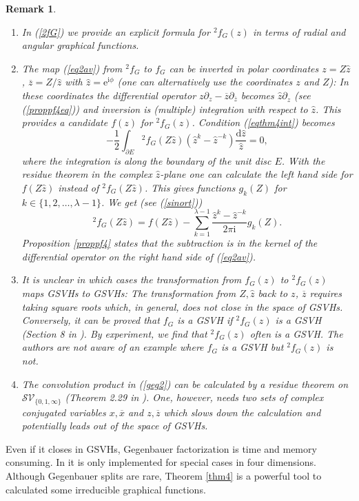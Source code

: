 \documentclass[oneside]{amsart}
\newcommand{\CC}{{\mathbb C}}
\newcommand{\ee}{\mathrm{e}}
\newcommand{\ii}{\mathrm{i}}
\newcommand{\dd}{\mathrm{d}}
\newcommand{\xx}{{\overline{x}}}
\newcommand{\zz}{{\overline{z}}}
\newcommand{\sS}{\mathcal{S}}
\newcommand{\sV}{\mathcal{V}}
\theoremstyle{plain}
\newtheorem{remark}[thm]{Remark}
\begin{document}
\begin{remark}
\begin{enumerate}
The parametric representation ensures that ${}^2\!f_G(z)/(z-\zz)$ is real-analytic on $\CC\backslash\{0,1\}$.
\item In (\ref{2fG}) we provide an explicit formula for ${}^2\!f_G(z)$ in terms of radial and angular graphical functions.
\item The map (\ref{eq2av}) from ${}^2\!f_G$ to $f_G$ can be inverted in polar coordinates $z=Z\hat{z}$, $\zz=Z/\hat{z}$ with $\hat{z}=\ee^{\ii\phi}$
(one can alternatively use the coordinates $z$ and $Z$): In these coordinates the differential operator $z\partial_z-\zz\partial_\zz$ becomes $\hat{z}\partial_{\hat{z}}$
(see (\ref{proppf4eq})) and inversion is (multiple) integration with respect to $\hat{z}$. This provides a candidate $f(z)$ for ${}^2\!f_G(z)$.
Condition (\ref{eqthm4int}) becomes
$$
-\frac{1}{2}\int_{\partial E}{}^2\!f_G(Z\hat{z})(\hat{z}^k-\hat{z}^{-k})\frac{\dd\hat{z}}{\hat{z}}=0,
$$
where the integration is along the boundary of the unit disc $E$. With the residue theorem in the complex $\hat{z}$-plane one can calculate the left hand side for $f(Z\hat{z})$
instead of ${}^2\!f_G(Z\hat{z})$. This gives functions $g_k(Z)$ for $k\in\{1,2,\ldots,\lambda-1\}$. We get (see (\ref{sinort}))
$$
{}^2\!f_G(Z\hat{z})=f(Z\hat{z})-\sum_{k=1}^{\lambda-1}\frac{\hat{z}^k-\hat{z}^{-k}}{2\pi\ii}g_k(Z).
$$
Proposition \ref{proppf4} states that the subtraction is in the kernel of the differential operator on the right hand side of (\ref{eq2av}).
\item It is unclear in which cases the transformation from $f_G(z)$ to ${}^2\!f_G(z)$ maps GSVHs to GSVHs:
The transformation from $Z,\hat z$ back to $z$, $\zz$ requires taking square roots which, in general, does not close in the space of GSVHs.
Conversely, it can be proved that $f_G$ is a GSVH if ${}^2\!f_G(z)$ is a GSVH (Section 8 in \cite{GSVH}). By experiment, we find that ${}^2\!f_G(z)$ often is a GSVH.
The authors are not aware of an example where $f_G$ is a GSVH but ${}^2\!f_G(z)$ is not.
\item The convolution product in (\ref{geg2}) can be calculated by a residue theorem on $\sS\sV_{\{0,1,\infty\}}$ (Theorem 2.29 in \cite{gf}).
One, however, needs two sets of complex conjugated variables $x,\xx$ and $z,\zz$ which slows down the calculation and potentially leads out of the space of GSVHs.
\end{enumerate}
\end{remark}

Even if it closes in GSVHs, Gegenbauer factorization is time and memory consuming. In \cite{Shlog} it is only implemented for special cases in four dimensions.
Although Gegenbauer splits are rare, Theorem \ref{thm4} is a powerful tool to calculated some irreducible graphical functions.
\end{document}
